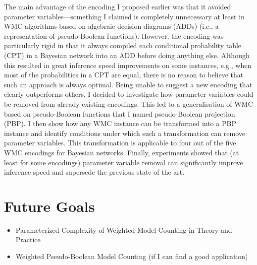 \documentclass{article}
\begin{document}
\begin{description}
  The main advantage of the encoding I proposed earlier was that it avoided
  parameter variables---something I claimed is completely unnecessary at
  least in WMC algorithms based on algebraic decision diagrams (ADDs) (i.e., a
  representation of pseudo-Boolean functions). However, the encoding was
  particularly rigid in that it always compiled each conditional probability
  table (CPT) in a Bayesian network into an ADD before doing anything else.
  Although this resulted in great inference speed improvements on some
  instances, e.g., when most of the probabilities in a CPT are equal, there is
  no reason to believe that such an approach is always optimal. Being unable to
  suggest a new encoding that clearly outperforms others, I decided to
  investigate how parameter variables could be removed from already-existing
  encodings. This led to a generalisation of WMC based on pseudo-Boolean
  functions that I named pseudo-Boolean projection (PBP). I then show how any
  WMC instance can be transformed into a PBP instance and identify conditions
  under which such a transformation can remove parameter variables. This
  transformation is applicable to four out of the five WMC encodings for
  Bayesian networks. Finally, experiments showed that (at least for some
  encodings) parameter variable removal can significantly improve inference
  speed and supersede the previous state of the art.
\end{description}

\section{Future Goals}

\begin{itemize}
\item Parameterized Complexity of Weighted Model Counting in Theory and
  Practice 
\item Weighted Pseudo-Boolean Model Counting (if I can find a good application)
\end{itemize}







\end{document}
